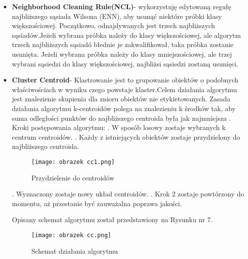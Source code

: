 \documentclass{article}
\begin{document}
\begin{itemize}
    \item \textbf{Neighborhood Cleaning Rule(NCL)}- wykorzystuję edytowaną regułę najbliższego sąsiada Wilsona (ENN),
    \cite{6891771}
    aby usunąć niektóre próbki klasy większościowej. Początkowo, odnajdywanych jest trzech najbliższych sąsiadów.Jeżeli wybrana próbka należy do klasy większościowej, ale algorytm trzech najbliższych sąsiadó błednie je zakwalifikował, taka próbka zostanie usunięta. Jeżeli wybrana próbka należy do klasy mniejszościowej, ale trzej wybrani sąsiedzi do klasy większościowej, najbliżsi sąsiedzi zostaną usunięci\cite{8921159}.
    \item \textbf{Cluster Centroid}- Klastrowanie jest to grupowanie obiektów o podobnych właściwościach w wyniku czego powstaje klaster.Celem działania algorytmu jest znalezienie skupienia dla znioru obiektów nie etykietowanych. Zasada działania algorytmu k-centroidów polega na znalezieniu k środków tak, aby suma odległości punktów do najbliższego centroida była jak najmniejsza \cite{clustercentroids}.
    Kroki postępowania algorytmu:
    . W sposób losowy zostaje wybranych k centrum centroidów.
    . Każdy z istniejących obiektów zostaje przydzielony do najbliższego centroida.
     \begin{figure}[h!]
\texttt{[image: obrazek cc1.png]}
\caption{Przydzielenie do centroidów} 
\label{fig:obrazek_cc1}
\end{figure}
    . Wyznaczony zostaje nowy układ centroidów.
    . Krok 2 zostaje powtórzony do momentu, aż przestanie być zauważalna poprawa jakości.
    \newline
    
Opisany schemat algorytmu został przedstawiony na Rysunku nr 7.
     \begin{figure}[h!]
\texttt{[image: obrazek cc.png]}
\caption{Schemat działania algorytmu} 
\label{fig:obrazek_cc1}
\end{figure}
    
    
    
\end{itemize}
\end{document}
